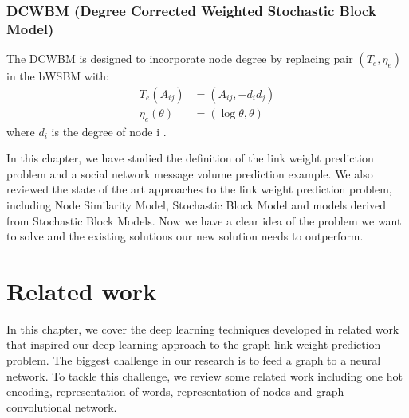 \documentclass[12pt]{WSUThesis}
\theoremstyle{definition}
\begin{document}
\subsection{DCWBM (Degree Corrected Weighted Stochastic Block Model)}
The DCWBM is designed to incorporate node degree
by replacing pair $ (T_e, \eta_e) $ in the bWSBM with:
\begin{align*}
T_e(A_{ij}) &= (A_{ij}, -d_id_j)\\
\eta_e(\theta) &= (\log\theta, \theta)
\end{align*}
where $ d_i $ is the degree of node i \cite{aicher2014learning}.

In this chapter, we have studied the definition of the link weight prediction problem and a social network message volume prediction example. We also reviewed the state of the art approaches to the link weight prediction problem, including Node Similarity Model, Stochastic Block Model and models derived from Stochastic Block Models. Now we have a clear idea of the problem we want to solve and the existing solutions our new solution needs to outperform.

\chapter{Related work}
In this chapter, we cover the deep learning techniques developed in related work
that inspired our deep learning approach to the graph link weight prediction problem.
The biggest challenge in our research is to feed a graph to a neural network.
To tackle this challenge, we review some related work including one hot encoding, representation of words, representation of nodes and graph convolutional network.
\end{document}
